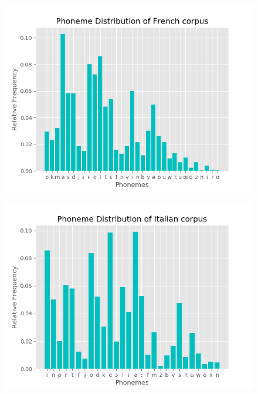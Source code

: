 \documentclass{article}
\begin{document}
\begin{itemize}
\begin{figure}[H]
\begin{minipage}{.5\textwidth}
                    \label{fig:prob1_6_2}
                \end{minipage}
        \end{figure}
        \begin{figure}[H]
            \centering
                \begin{minipage}{.55\textwidth}
                    \centering
                    \includegraphics[keepaspectratio=true,scale=0.35]{./source/EX1.1_files/French.png} 
                    \label{fig:prob1_6_2}
                \end{minipage}%
                \begin{minipage}{.5\textwidth}
                    \centering
                    \includegraphics[keepaspectratio=true,scale=0.35]{./source/EX1.1_files/Italian.png}   
                    \label{fig:prob1_6_2}
                \end{minipage}
        \end{figure}
        

\end{itemize}
\end{document}
